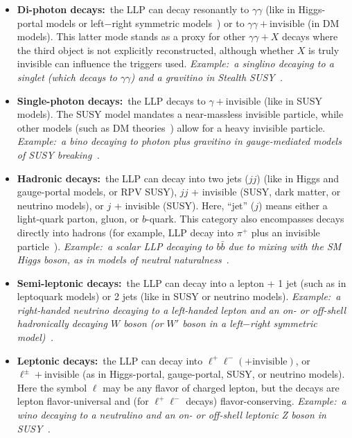 \begin{itemize}
\item {\bf Di-photon decays:}~the LLP can decay resonantly to $\gamma\gamma$ (like in Higgs-portal models or left$-$right symmetric models~\cite{Dev:2016vle}) or to $\gamma\gamma+\mathrm{invisible}$ (in DM models).
This latter mode stands as a proxy for other $\gamma\gamma+X$ decays where the third object is not explicitly reconstructed, although whether $X$ is truly invisible can influence the triggers used.
\emph{Example:~a singlino decaying to a singlet (which decays to $\gamma\gamma$) and a gravitino in Stealth SUSY~\cite{Fan:2011yu}.}

\item {\bf Single-photon decays:}~the LLP decays to $\gamma+\mathrm{invisible}$ (like in SUSY models).
The SUSY model mandates a near-massless invisible particle, while other models (such as DM theories~\cite{Weiner:2012cb,Primulando:2015lfa}) allow for a heavy invisible particle.
\emph{Example:~a bino decaying to photon plus gravitino in gauge-mediated models of SUSY breaking~\cite{Dimopoulos:1996yq}.}

\item {\bf Hadronic decays:}~the LLP can decay into two jets ($jj$) (like in Higgs and gauge-portal models, or RPV SUSY), $jj$ + invisible (SUSY, dark matter, or neutrino models), or $j$ + invisible (SUSY).
Here, ``jet'' ($j$) means either a light-quark parton, gluon, or $b$-quark.
This category also encompasses decays directly into hadrons (for example, LLP decay into $\pi^+$ plus an invisible particle~\cite{Chen:1995yu,Thomas:1998wy,Feng:1999fu}).
\emph{Example:~a scalar LLP decaying to $b\bar{b}$ due to mixing with the SM Higgs boson, as in models of neutral naturalness~\cite{Chacko:2005pe,Burdman:2006tz,Craig:2015pha}}.

\item {\bf Semi-leptonic decays:}~the LLP can decay into a lepton + 1 jet (such as in leptoquark models) or 2 jets (like in SUSY or neutrino models).
\emph{Example:~a right-handed neutrino decaying to a left-handed lepton and an on- or off-shell hadronically decaying $W$ boson (or $W'$ boson in a left$-$right symmetric model)~\cite{Keung:1983uu}. }

\item {\bf Leptonic decays:}~the LLP can decay into $\ell^+\ell^-(+\mathrm{invisible})$, or $\ell^\pm+\mathrm{invisible}$ (as in Higgs-portal, gauge-portal, SUSY, or neutrino models).
Here the symbol $\ell$ may be any flavor of charged lepton, but the decays are lepton flavor-universal and (for $\ell^+\ell^-$ decays) flavor-conserving.
\emph{Example:~a wino decaying to a neutralino and an on- or off-shell leptonic Z boson in SUSY~\cite{Barbier:2004ez}.}


\end{itemize}
